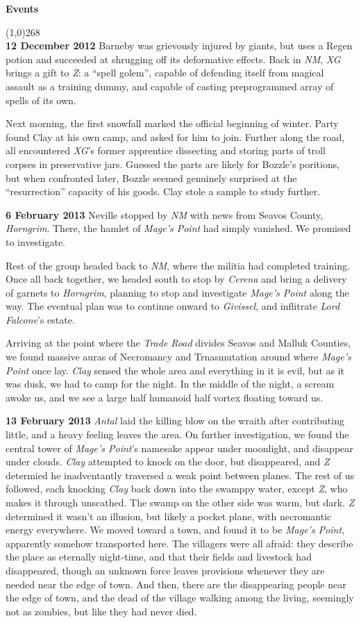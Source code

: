 \documentclass[letterpaper]{article}
\newcommand{\colline}{\line(1,0){268} \\}
\newcommand{\e}[1]{\emph{#1}}
\newcommand{\B}[1]{\textbf{#1}}
\newenvironment{notesection}[1]
{ {\huge \B{#1}} \par
\vspace{-0.75em}
\colline
\begingroup\fontsize{9pt}{12pt}\selectfont}
{\endgroup}
\begin{document}
\begin{notesection}{Events}
\B{12 December 2012} Barneby was grievously injured by giants, but uses a Regen potion and succeeded at shrugging off its deformative effects. Back in \e{NM}, \e{XG} brings a gift to \e{Z}: a ``spell golem'', capable of defending itself from magical assault as a training dummy, and capable of casting preprogrammed array of spells of its own.

Next morning, the first snowfall marked the official beginning of winter.  Party found Clay at his own camp, and asked for him to join.  Further along the road, all encountered \e{XG}'s former apprentice dissecting and storing parts of troll corpses in preservative jars.  Guessed the parts are likely for Bozzle's poritions, but when confronted later, Bozzle seemed genuinely surprised at the ``resurrection'' capacity of his goods.  Clay stole a sample to study further.

\B{6 February 2013} Neville stopped by \e{NM} with news from Seavos County, \e{Horngrim}.  There, the hamlet of \e{Mage's Point} had simply vanished.  We promised to investigate.

Rest of the group headed back to \e{NM}, where the militia had completed training. Once all back together, we headed south to stop by \e{Cerena} and bring a delivery of garnets to \e{Horngrim}, planning to stop and investigate \e{Mage's Point} along the way.  The eventual plan was to continue onward to \e{Givissel}, and inflitrate \e{Lord Falcone}'s estate.

Arriving at the point where the \e{Trade Road} divides Seavos and Malluk Counties, we found massive auras of Necromancy and Trnasmutation around where \e{Mage's Point} once lay. \e{Clay} sensed the whole area and everything in it is evil, but as it was dusk, we had to camp for the night.  In the middle of the night, a scream awoke us, and we see a large half humanoid half vortex floating toward us.

\B{13 February 2013} \e{Antal} laid the killing blow on the wraith after contributing little, and a heavy feeling leaves the area.  On further investigation, we found the central tower of \e{Mage's Point}'s namesake appear under moonlight, and disappear under clouds.  \e{Clay} attempted to knock on the door, but disappeared, and \e{Z} determied he inadventantly traversed a weak point between planes. The rest of us followed, each knocking \e{Clay} back down into the swamppy water, except \e{Z}, who makes it through unscathed. The swamp on the other side was warm, but dark. \e{Z} determined it wasn't an illusion, but likely a pocket plane, with necromantic energy everywhere. We moved toward a town, and found it to be \e{Mage's Point}, apparently somehow transported here.  The villagers were all afraid: they describe the place as eternally night-time, and that their fields and livestock had disappeared, though an unknown force leaves provisions whenever they are needed near the edge of town.  And then, there are the disappearing people near the edge of town, and the dead of the village walking among the living, seemingly not as zombies, but like they had never died.


\end{notesection}
\end{document}
